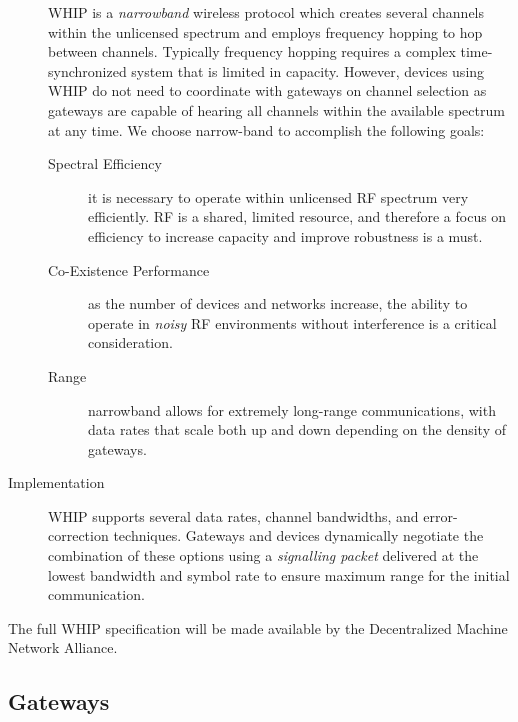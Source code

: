 \documentclass[UTF8, 10pt, nonatbib, nocopyrightspace, reprint]{sigplanconf}
\begin{document}
\begin{description}
    WHIP is a \emph{narrowband} wireless protocol which creates several channels within the unlicensed spectrum and employs frequency hopping to hop between channels. Typically frequency hopping requires a complex time-synchronized system that is limited in capacity. However, devices using WHIP do not need to coordinate with gateways on channel selection as gateways are capable of hearing all channels within the available spectrum at any time. We choose narrow-band to accomplish the following goals:

    \begin{description}
        \item[Spectral Efficiency] it is necessary to operate within unlicensed RF spectrum very efficiently. RF is a shared, limited resource, and therefore a focus on efficiency to increase capacity and improve robustness is a must.
        \item[Co-Existence Performance] as the number of devices and networks increase, the ability to operate in \emph{noisy} RF environments without interference is a critical consideration.
        \item[Range] narrowband allows for extremely long-range communications, with data rates that scale both up and down depending on the density of gateways.
    \end{description}

    \item [Implementation] WHIP supports several data rates, channel bandwidths, and error-correction techniques. Gateways and devices dynamically negotiate the combination of these options using a \emph{signalling packet} delivered at the lowest bandwidth and symbol rate to ensure maximum range for the initial communication.
\end{description}

The full WHIP specification will be made available by the Decentralized Machine Network Alliance.

\subsection{Gateways}\label{gateways}
\end{document}
